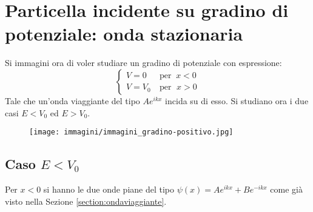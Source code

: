 \documentclass{article}
\begin{document}
\section{Particella incidente su gradino di potenziale: onda stazionaria}
Si immagini ora di voler studiare un gradino di potenziale con espressione:
\[
    \begin{cases}
    V = 0 &\: \text{per } \: x<0 \\
    V = V_0 &\: \text{per } \; x>0 
    \end{cases}
\]
Tale che un'onda viaggiante del tipo \(Ae^{ikx}\) incida su di esso.
Si studiano ora i due casi \(E<V_0\) ed \(E>V_0\).

\begin{figure}[ht]
\centering
\texttt{[image: immagini/immagini\_gradino-positivo.jpg]}
\label{gradino-positivo}
\end{figure}



\subsection{Caso \(E<V_0\)}
\label{section:gradino-low-energy}
Per \(x<0\) si hanno le due onde piane del tipo \(\psi(x) = Ae^{ikx}+Be^{-ikx}\) come già visto nella Sezione \ref{section:ondaviaggiante}. 
\end{document}
